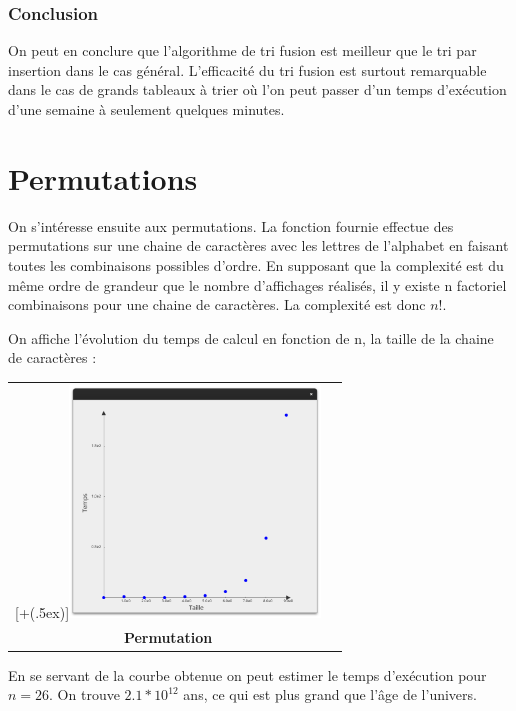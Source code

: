 \documentclass[12pt]{article}
\newcommand*{\addheight}[2][.5ex]{%
  \raisebox{0pt}[\dimexpr\height+(#1)\relax]{#2}%
}
\begin{document}
\subsubsection*{Conclusion}

On peut en conclure que l'algorithme de tri fusion est meilleur que le tri par insertion dans le cas général. L'efficacité du tri fusion est surtout remarquable dans le cas de grands tableaux à trier où l'on peut passer d'un temps d'exécution d'une semaine à seulement quelques minutes.


\section{Permutations}

On s'intéresse ensuite aux permutations.
La fonction fournie effectue des permutations sur une chaine de caractères avec les lettres de l'alphabet en faisant toutes les combinaisons possibles d'ordre.
En supposant que la complexité est du même ordre de grandeur que le nombre d'affichages réalisés, il y existe n factoriel combinaisons pour une chaine de caractères. La complexité est donc $n!$.


On affiche l'évolution du temps de calcul en fonction de n, la taille de la chaine de caractères :

\begin{tabular}[H]{c c}
    \addheight{\includegraphics[width=18em]{permu.png}}  & \\
    \small \textbf{Permutation} & \\
\end{tabular}

En se servant de la courbe obtenue on peut estimer le temps d'exécution pour $n=26$. On trouve $2.1*10^12$ ans, ce qui est plus grand que l'âge de l'univers.
\end{document}
